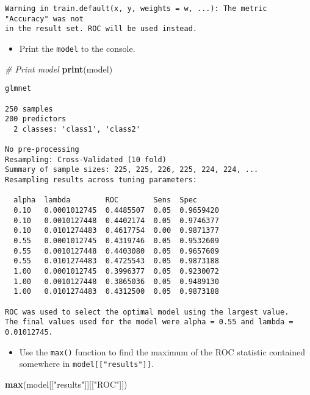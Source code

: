 \documentclass[
]{book}
\newenvironment{Shaded}{\begin{snugshade}}{\end{snugshade}}
\newcommand{\CommentTok}[1]{\textcolor[rgb]{0.56,0.35,0.01}{\textit{#1}}}
\newcommand{\KeywordTok}[1]{\textcolor[rgb]{0.13,0.29,0.53}{\textbf{#1}}}
\newcommand{\NormalTok}[1]{#1}
\newcommand{\StringTok}[1]{\textcolor[rgb]{0.31,0.60,0.02}{#1}}
\providecommand{\tightlist}{%
  \setlength{\itemsep}{0pt}\setlength{\parskip}{0pt}}
\begin{document}
\begin{verbatim}
Warning in train.default(x, y, weights = w, ...): The metric "Accuracy" was not
in the result set. ROC will be used instead.
\end{verbatim}

\begin{itemize}
\tightlist
\item
  Print the \texttt{model} to the console.
\end{itemize}

\begin{Shaded}
\begin{Highlighting}[]
\CommentTok{# Print model}
\KeywordTok{print}\NormalTok{(model)}
\end{Highlighting}
\end{Shaded}

\begin{verbatim}
glmnet 

250 samples
200 predictors
  2 classes: 'class1', 'class2' 

No pre-processing
Resampling: Cross-Validated (10 fold) 
Summary of sample sizes: 225, 225, 226, 225, 224, 224, ... 
Resampling results across tuning parameters:

  alpha  lambda        ROC        Sens  Spec     
  0.10   0.0001012745  0.4485507  0.05  0.9659420
  0.10   0.0010127448  0.4402174  0.05  0.9746377
  0.10   0.0101274483  0.4617754  0.00  0.9871377
  0.55   0.0001012745  0.4319746  0.05  0.9532609
  0.55   0.0010127448  0.4403080  0.05  0.9657609
  0.55   0.0101274483  0.4725543  0.05  0.9873188
  1.00   0.0001012745  0.3996377  0.05  0.9230072
  1.00   0.0010127448  0.3865036  0.05  0.9489130
  1.00   0.0101274483  0.4312500  0.05  0.9873188

ROC was used to select the optimal model using the largest value.
The final values used for the model were alpha = 0.55 and lambda = 0.01012745.
\end{verbatim}

\begin{itemize}
\tightlist
\item
  Use the \texttt{max()} function to find the maximum of the ROC statistic contained somewhere in \texttt{model{[}{[}"results"{]}{]}}.
\end{itemize}

\begin{Shaded}
\begin{Highlighting}[]
\KeywordTok{max}\NormalTok{(model[[}\StringTok{"results"}\NormalTok{]][[}\StringTok{"ROC"}\NormalTok{]])}
\end{Highlighting}
\end{Shaded}
\end{document}
